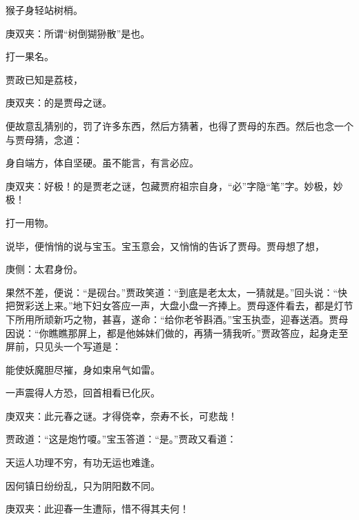 \begin{parag}
    猴子身轻站树梢。\begin{note}庚双夹：所谓“树倒猢狲散”是也。\end{note}打一果名。
\end{parag}


\begin{parag}
    贾政已知是荔枝，\begin{note}庚双夹：的是贾母之谜。\end{note}便故意乱猜别的，罚了许多东西，然后方猜著，也得了贾母的东西。然后也念一个与贾母猜，念道：
\end{parag}


\begin{parag}
    身自端方，体自坚硬。虽不能言，有言必应。\begin{note}庚双夹：好极！的是贾老之谜，包藏贾府祖宗自身，“必”字隐“笔”字。妙极，妙极！\end{note}打一用物。
\end{parag}


\begin{parag}
    说毕，便悄悄的说与宝玉。宝玉意会，又悄悄的告诉了贾母。贾母想了想，\begin{note}庚侧：太君身份。\end{note}果然不差，便说：“是砚台。”贾政笑道：“到底是老太太，一猜就是。”回头说：“快把贺彩送上来。”地下妇女答应一声，大盘小盘一齐捧上。贾母逐件看去，都是灯节下所用所顽新巧之物，甚喜，遂命：“给你老爷斟酒。”宝玉执壶，迎春送酒。贾母因说：“你瞧瞧那屏上，都是他姊妹们做的，再猜一猜我听。”贾政答应，起身走至屏前，只见头一个写道是：
\end{parag}


\begin{poem}
    \begin{pl}能使妖魔胆尽摧，身如束帛气如雷。\end{pl}

    \begin{pl}一声震得人方恐，回首相看已化灰。\end{pl}
    \begin{note}庚双夹：此元春之谜。才得侥幸，奈寿不长，可悲哉！\end{note}
\end{poem}


\begin{parag}
    贾政道：“这是炮竹嗄。”宝玉答道：“是。”贾政又看道：
\end{parag}


\begin{poem}
    \begin{pl}天运人功理不穷，有功无运也难逢。\end{pl}

    \begin{pl}因何镇日纷纷乱，只为阴阳数不同。\end{pl}
    \begin{note}庚双夹：此迎春一生遭际，惜不得其夫何！\end{note}
\end{poem}



